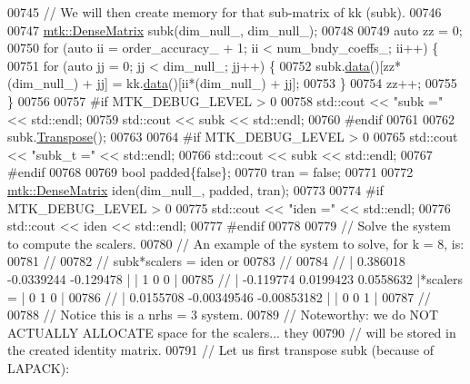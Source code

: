 \begin{DoxyCode}
{{00745   \textcolor{comment}{// We will then create memory for that sub-matrix of kk (subk).}
00746 
00747   \hyperlink{classmtk_1_1DenseMatrix}{mtk::DenseMatrix} subk(dim\_null\_, dim\_null\_);
00748 
00749   \textcolor{keyword}{auto} zz = 0;
00750   \textcolor{keywordflow}{for} (\textcolor{keyword}{auto} ii = order\_accuracy\_ + 1; ii < num\_bndy\_coeffs\_; ii++) \{
00751     \textcolor{keywordflow}{for} (\textcolor{keyword}{auto} jj = 0; jj < dim\_null\_; jj++) \{
00752       subk.\hyperlink{classmtk_1_1DenseMatrix_a16b3ff56feb2658b9fc7147d1de4d8e7}{data}()[zz*(dim\_null\_) + jj] = kk.\hyperlink{classmtk_1_1DenseMatrix_a16b3ff56feb2658b9fc7147d1de4d8e7}{data}()[ii*(dim\_null\_) + jj];
00753     \}
00754     zz++;
00755   \}
00756 
00757 \textcolor{preprocessor}{  #if MTK\_DEBUG\_LEVEL > 0}
00758   std::cout << \textcolor{stringliteral}{"subk ="} << std::endl;
00759   std::cout << subk << std::endl;
00760 \textcolor{preprocessor}{  #endif}
00761 
00762   subk.\hyperlink{classmtk_1_1DenseMatrix_a71d9c07ca66e88d97d1fd5012f43138b}{Transpose}();
00763 
00764 \textcolor{preprocessor}{  #if MTK\_DEBUG\_LEVEL > 0}
00765   std::cout << \textcolor{stringliteral}{"subk\_t ="} << std::endl;
00766   std::cout << subk << std::endl;
00767 \textcolor{preprocessor}{  #endif}
00768 
00769   \textcolor{keywordtype}{bool} padded\{\textcolor{keyword}{false}\};
00770   tran = \textcolor{keyword}{false};
00771 
00772   \hyperlink{classmtk_1_1DenseMatrix}{mtk::DenseMatrix} iden(dim\_null\_, padded, tran);
00773 
00774 \textcolor{preprocessor}{  #if MTK\_DEBUG\_LEVEL > 0}
00775   std::cout << \textcolor{stringliteral}{"iden ="} << std::endl;
00776   std::cout << iden << std::endl;
00777 \textcolor{preprocessor}{  #endif}
00778 
00779   \textcolor{comment}{// Solve the system to compute the scalers.}
00780   \textcolor{comment}{// An example of the system to solve, for k = 8, is:}
00781   \textcolor{comment}{//}
00782   \textcolor{comment}{// subk*scalers = iden or}
00783   \textcolor{comment}{//}
00784   \textcolor{comment}{// |  0.386018  -0.0339244   -0.129478 |           | 1 0 0 |}
00785   \textcolor{comment}{// | -0.119774   0.0199423   0.0558632 |*scalers = | 0 1 0 |}
00786   \textcolor{comment}{// | 0.0155708 -0.00349546 -0.00853182 |           | 0 0 1 |}
00787   \textcolor{comment}{//}
00788   \textcolor{comment}{// Notice this is a nrhs = 3 system.}
00789   \textcolor{comment}{// Noteworthy: we do NOT ACTUALLY ALLOCATE space for the scalers... they}
00790   \textcolor{comment}{// will be stored in the created identity matrix.}
00791   \textcolor{comment}{// Let us first transpose subk (because of LAPACK):}
}}
\end{DoxyCode}
